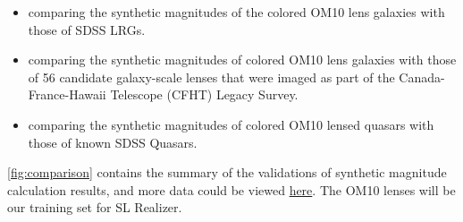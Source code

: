 \documentclass[\docopts]{\docclass}
\begin{document}
\begin{itemize}
  \item comparing the synthetic magnitudes of the colored OM10 lens galaxies with those of SDSS LRGs.
  \item comparing the synthetic magnitudes of colored OM10 lens galaxies with those of 56 candidate galaxy-scale lenses that were imaged as part of the Canada-France-Hawaii Telescope (CFHT) Legacy Survey.
  \item comparing the synthetic magnitudes of colored OM10 lensed quasars with those of known SDSS Quasars.
\end{itemize}

 \ref{fig:comparison} contains the summary of the validations of synthetic magnitude calculation results, and more data could be viewed  \href{https://github.com/drphilmarshall/OM10/blob/master/notebooks/Color%20Comparison.ipynb}{here}. The OM10 lenses will be our training set for SL Realizer.
\end{document}
